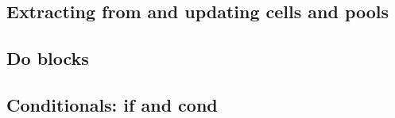 \documentclass{article}
\theoremstyle{definition}
\begin{document}


\hypertarget{hsec:cell-pool-forms}{}
\subsection{Extracting from and updating cells and pools}
\label{sec:cell-pool-forms}



\hypertarget{hsec:doblocks}{}
\subsection{Do blocks}
\label{sec:doblocks}


\hypertarget{hsec:conditionals}{}
\subsection{Conditionals: if and cond}
\label{sec:conditionals}

\end{document}
